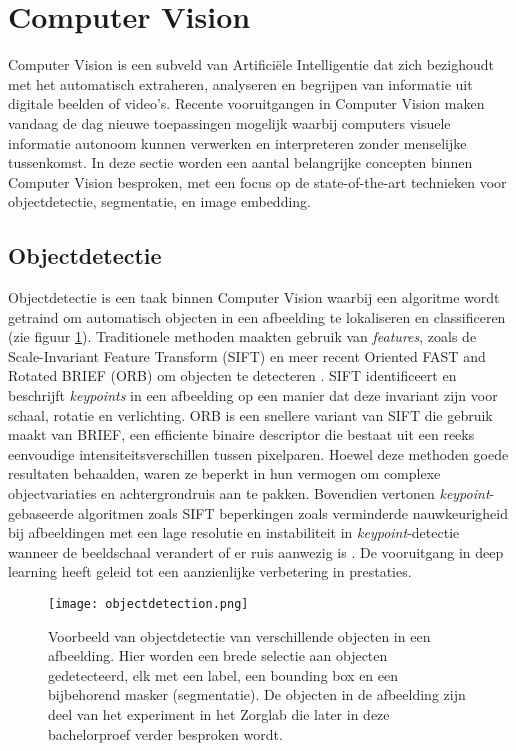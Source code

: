 \section{Computer Vision}

Computer Vision is een subveld van Artificiële Intelligentie dat zich bezighoudt met het automatisch extraheren, analyseren en begrijpen van informatie uit digitale beelden of video's.
Recente vooruitgangen in Computer Vision maken vandaag de dag nieuwe toepassingen mogelijk waarbij computers visuele informatie autonoom kunnen verwerken en interpreteren zonder menselijke tussenkomst.
In deze sectie worden een aantal belangrijke concepten binnen Computer Vision besproken, met een focus op de state-of-the-art technieken voor objectdetectie, segmentatie, en image embedding.

\subsection{Objectdetectie}

Objectdetectie is een taak binnen Computer Vision waarbij een algoritme wordt getraind om automatisch objecten in een afbeelding te lokaliseren en classificeren (zie figuur \ref{fig:object-detection}).
Traditionele methoden maakten gebruik van \textit{features}, zoals de Scale-Invariant Feature Transform (SIFT) en meer recent Oriented FAST and Rotated BRIEF (ORB) om objecten te detecteren \autocite{Lindeberg2012, Rublee2011}.
SIFT identificeert en beschrijft \textit{keypoints} in een afbeelding op een manier dat deze invariant zijn voor schaal, rotatie en verlichting.
ORB is een snellere variant van SIFT die gebruik maakt van BRIEF, een efficiente binaire descriptor die bestaat uit een reeks eenvoudige intensiteitsverschillen tussen pixelparen.
Hoewel deze methoden goede resultaten behaalden, waren ze beperkt in hun vermogen om complexe objectvariaties en achtergrondruis aan te pakken. Bovendien vertonen \textit{keypoint}-gebaseerde algoritmen 
zoals SIFT beperkingen zoals verminderde nauwkeurigheid bij afbeeldingen met een lage resolutie en instabiliteit in \textit{keypoint}-detectie wanneer de beeldschaal verandert of er ruis aanwezig is \autocite{Ives2015}.
De vooruitgang in deep learning heeft geleid tot een aanzienlijke verbetering in prestaties.

\begin{figure}[H]
  \centering
  \texttt{[image: objectdetection.png]}
  \caption[]{\label{fig:object-detection}
  Voorbeeld van objectdetectie van verschillende objecten in een afbeelding. 
  Hier worden een brede selectie aan objecten gedetecteerd, elk met een label, een bounding box en een bijbehorend masker (segmentatie).
  De objecten in de afbeelding zijn deel van het experiment in het Zorglab die later in deze bachelorproef verder besproken wordt.
  }
\end{figure}

